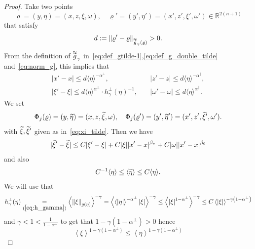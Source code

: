 \documentclass[AHL,Unicode,longabstracts,published]{cedram}
\newcommand*\eq[1]{\underset{(#1)}{=}}
\newcommand{\bbR}{\mathbb{R}}
\let\oldtilde\tilde
\renewcommand*{\tilde}[1]{\mathchoice{\widetilde{#1}}{\widetilde{#1}}{\oldtilde{#1}}{\oldtilde{#1}}}
\newcommand{\bbR}{\mathbb{R}}
\begin{document}
\begin{proof}
Take two points
\[
\varrho=(y,\eta)=(x,z,\xi,\omega),\quad\varrho'=(y',\eta')=(x',z',\xi',\omega')\in\bbR^{2\left(n+1\right)}
\]
that satisfy
\[
d:=\|\varrho'-\varrho\|_{\overset{\thickapprox}{g}_{\gamma}\left(\varrho\right)}>0.
\]
From the definition of $\overset{\thickapprox}{g}_{\gamma}$ in~\eqref{eq:def_gtilde-1},\eqref{eq:def_g_double_tilde} and~\eqref{eq:norm_g}, this implies that
\begin{align*}
|x'-x|\le d\langle\eta\rangle^{-\alpha^{\perp}}, &\quad|z'-z|\le d\langle\eta\rangle^{-\alpha^{\parallel}},\\
|\xi'-\xi|\le d\langle\eta\rangle^{\alpha^{\perp}}\cdot h_{\gamma}^{\perp}(\eta)^{-1},&\quad|\omega'-\omega|\le d\langle\eta\rangle^{\alpha^{\parallel}}.
\end{align*}
We set
\[
\Phi_{j}(\varrho)=(y,\tilde{\eta})=(x,z,\tilde{\xi},\omega),\quad\Phi_{j}(\varrho')=(y',\tilde{\eta}')=(x',z',\tilde{\xi}',\omega').
\]
with $\tilde{\xi},\tilde{\xi}'$ given as in~\eqref{eq:xi_tilde}. Then we have
\[
|\tilde{\xi}'-\tilde{\xi}|\le C|\xi'-\xi|+C|\xi||x'-x|^{\beta_{*}}+C|\omega||x'-x|^{\beta_{0}}
\]
and also
\[
C^{-1}\langle\eta\rangle\le\langle\tilde{\eta}\rangle\le C\langle\eta\rangle.
\]
We will use that
\begin{equation}\label{eq:*7}
h_{\gamma}^{\perp}(\eta)\eq{\ref{eq:h_gamma}}\left\langle \left\Vert \xi\right\Vert _{g\left(\eta\right)}\right\rangle ^{-\gamma}=\left\langle \left\langle \left|\eta\right|\right\rangle ^{-\alpha^{\perp}}\left|\xi\right|\right\rangle ^{-\gamma}\leq\left\langle \left|\xi\right|^{1-\alpha^{\perp}}\right\rangle ^{-\gamma}\leq C\left\langle \left|\xi\right|\right\rangle ^{-\gamma\left(1-\alpha^{\perp}\right)}
\end{equation}
and $\gamma<1<\frac{1}{1-\alpha^{\perp}}$ to get that $1-\gamma(1-\alpha^{\perp})>0$ hence
\begin{equation}\label{eq:*8} 
\left\langle \xi\right\rangle ^{1-\gamma\left(1-\alpha^{\perp}\right)}\leq\left\langle \eta\right\rangle ^{1-\gamma\left(1-\alpha^{\perp}\right)}
\end{equation}


\end{proof}
\end{document}

